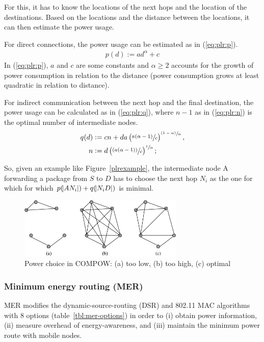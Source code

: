 For this, it has to know the locations of the next hops and the location of
the destinations. Based on the locations and the distance between the locations,
it can then estimate the power usage.

For direct connections, the power usage can be estimated as in (\ref{eq:plr:p}).
\begin{align}\label{eq:plr:p} p(d) := ad^{\alpha} + c \end{align}
In (\ref{eq:plr:p}), $a$ and $c$ are some constants and $\alpha \ge 2$ accounts
for the growth of power consumption in relation to the distance (power consumption
grows at least quadratic in relation to distance).

For indirect communication between the next hop and the final destination,
the power usage can be calculated as in (\ref{eq:plr:q}), where $n-1$ as in (\ref{eq:plr:n}) is the optimal number of intermediate nodes\cite{stojmenovic2001power}.
\begin{align}
  \label{eq:plr:q}
   q(d) &:= cn + da \left(\sfrac{a(\alpha - 1)}{c}\right)^{\sfrac{(1-\alpha)}{\alpha}}, \\
   \label{eq:plr:n}
      n &:= d\left(\sfrac{(a(\alpha - 1))}{c}\right)^{\sfrac{1}{\alpha}};
\end{align}

So, given an example like Figure~\ref{plrexample}, the intermediate node A
forwarding a package from $S$ to $D$ has to choose the next hop $N_{i}$ as the one for which
for which $p(\abs{AN_{i}}) + q(\abs{N_{i}D})$ is minimal.

\begin{figure}
\centering
\includegraphics[width=0.7\textwidth]{images/compow-level-choice}
\caption{Power choice in COMPOW: (a) too low, (b) too high, (c) optimal}
\label{compow:power-choice}
\end{figure}

\subsubsection{Minimum energy routing (MER)}
MER\cite{doshi2002demand} modifies the dynamic-source-routing (DSR)\cite{johnson1996dynamic}
and 802.11 MAC algorithms\cite{woesner1998power} with 8 options (table~\ref{tbl:mer-options}) in order to
(i) obtain power information, (ii) measure overhead of energy-awareness, and
(iii) maintain the minimum power route with mobile nodes.

